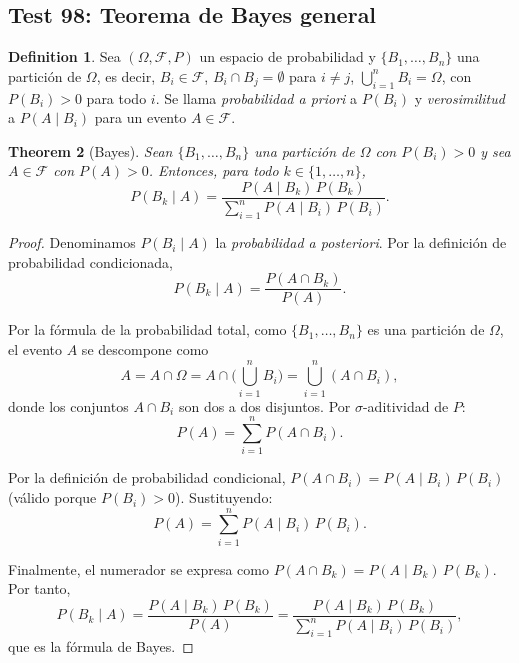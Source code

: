 \documentclass[11pt,a4paper]{article}
\theoremstyle{plain}
\newtheorem{theorem}{Theorem}[section]
\theoremstyle{definition}
\newtheorem{definition}[theorem]{Definition}
\begin{document}
\subsection*{Test 98: Teorema de Bayes general}

\begin{definition}
Sea $(\Omega,\mathcal{F},P)$ un espacio de probabilidad y $\{B_{1},\dots,B_{n}\}$ una partición de $\Omega$, es decir, $B_{i}\in\mathcal{F}$, $B_{i}\cap B_{j}=\emptyset$ para $i\neq j$, $\bigcup_{i=1}^{n}B_{i}=\Omega$, con $P(B_{i})>0$ para todo $i$. Se llama \emph{probabilidad a priori} a $P(B_{i})$ y \emph{verosimilitud} a $P(A\mid B_{i})$ para un evento $A\in\mathcal{F}$.
\end{definition}

\begin{theorem}[Bayes]
Sean $\{B_{1},\dots,B_{n}\}$ una partición de $\Omega$ con $P(B_{i})>0$ y sea $A\in\mathcal{F}$ con $P(A)>0$. Entonces, para todo $k\in\{1,\dots,n\}$,
\[
P(B_{k}\mid A)=\frac{P(A\mid B_{k})\,P(B_{k})}{\displaystyle\sum_{i=1}^{n}P(A\mid B_{i})\,P(B_{i})}.
\]
\end{theorem}

\begin{proof}
Denominamos $P(B_{i}\mid A)$ la \emph{probabilidad a posteriori}. Por la definición de probabilidad condicionada,
\[
P(B_{k}\mid A)=\frac{P(A\cap B_{k})}{P(A)}.
\]

Por la fórmula de la probabilidad total, como $\{B_{1},\dots,B_{n}\}$ es una partición de $\Omega$, el evento $A$ se descompone como
\[
A=A\cap\Omega=A\cap\biggl(\bigcup_{i=1}^{n}B_{i}\biggr)=\bigcup_{i=1}^{n}(A\cap B_{i}),
\]
donde los conjuntos $A\cap B_{i}$ son dos a dos disjuntos. Por $\sigma$-aditividad de $P$:
\[
P(A)=\sum_{i=1}^{n}P(A\cap B_{i}).
\]

Por la definición de probabilidad condicional, $P(A\cap B_{i})=P(A\mid B_{i})\,P(B_{i})$ (válido porque $P(B_{i})>0$). Sustituyendo:
\[
P(A)=\sum_{i=1}^{n}P(A\mid B_{i})\,P(B_{i}).
\]

Finalmente, el numerador se expresa como $P(A\cap B_{k})=P(A\mid B_{k})\,P(B_{k})$. Por tanto,
\[
P(B_{k}\mid A)=\frac{P(A\mid B_{k})\,P(B_{k})}{P(A)}=\frac{P(A\mid B_{k})\,P(B_{k})}{\displaystyle\sum_{i=1}^{n}P(A\mid B_{i})\,P(B_{i})},
\]
que es la fórmula de Bayes.
\end{proof}
\end{document}
